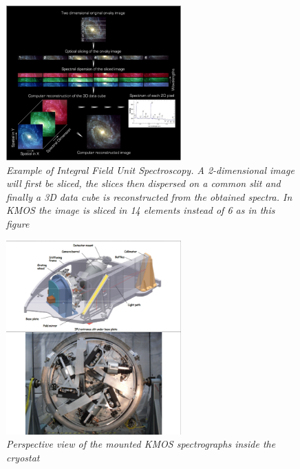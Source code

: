 \documentclass{literature}
\begin{document}
\begin{figure}[!htp]
\centering
\includegraphics[width=0.6\textwidth]{kmos_disperse.png}
\caption{\footnotesize{\emph{Example of Integral Field Unit Spectroscopy. A 2-dimensional image will first be sliced, the slices then dispersed on a common slit and finally a 3D data cube is reconstructed from the obtained spectra. In KMOS the image is sliced in 14 elements instead of 6 as in this figure}}}
\label{fig:kmos_disperse}
\end{figure}

\begin{figure}[!htp]
\centering
\includegraphics[width=0.6\textwidth]{kmos_speectrographs.png}
\caption{\footnotesize{\emph{Perspective view of the mounted KMOS spectrographs inside the cryostat}}}
\label{fig:kmos_spectrographs}
\end{figure}
\end{document}
